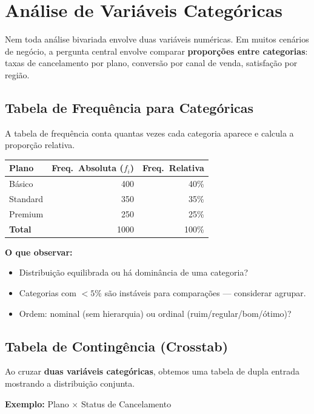 \section{Análise de Variáveis Categóricas}

Nem toda análise bivariada envolve duas variáveis numéricas. Em muitos cenários de negócio, a pergunta central envolve comparar \textbf{proporções entre categorias}: taxas de cancelamento por plano, conversão por canal de venda, satisfação por região.

\subsection*{Tabela de Frequência para Categóricas}

A tabela de frequência conta quantas vezes cada categoria aparece e calcula a proporção relativa.

\begin{center}
\begin{tabular}{|l|r|r|}
\hline
\textbf{Plano} & \textbf{Freq.\ Absoluta ($f_i$)} & \textbf{Freq.\ Relativa} \\
\hline
Básico   & 400 & 40\% \\
Standard & 350 & 35\% \\
Premium  & 250 & 25\% \\
\hline
\textbf{Total} & 1000 & 100\% \\
\hline
\end{tabular}
\end{center}

\textbf{O que observar:}
\begin{itemize}[leftmargin=*]
  \item Distribuição equilibrada ou há dominância de uma categoria?
  \item Categorias com $<5\%$ são instáveis para comparações --- considerar agrupar.
  \item Ordem: nominal (sem hierarquia) ou ordinal (ruim/regular/bom/ótimo)?
\end{itemize}

\subsection*{Tabela de Contingência (Crosstab)}

Ao cruzar \textbf{duas variáveis categóricas}, obtemos uma tabela de dupla entrada mostrando a distribuição conjunta.

\textbf{Exemplo:} Plano $\times$ Status de Cancelamento

